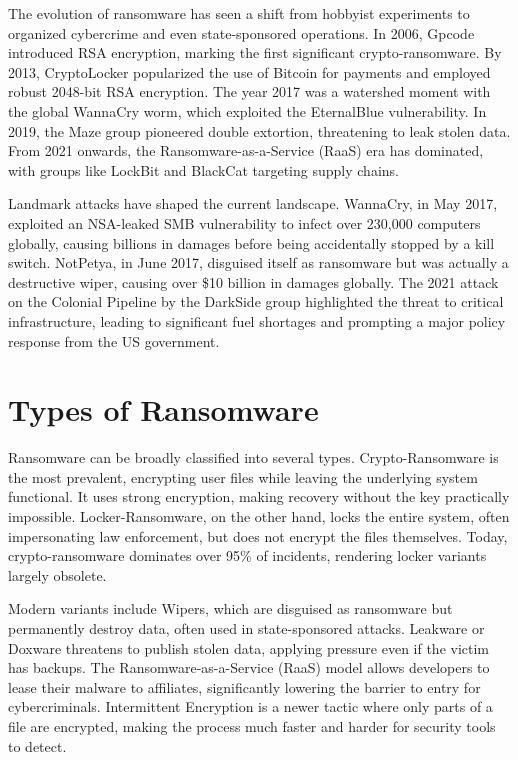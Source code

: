 \documentclass[12pt,a4paper]{article}
\begin{document}
The evolution of ransomware has seen a shift from hobbyist experiments to organized cybercrime and even state-sponsored operations. In 2006, Gpcode introduced RSA encryption, marking the first significant crypto-ransomware. By 2013, CryptoLocker popularized the use of Bitcoin for payments and employed robust 2048-bit RSA encryption. The year 2017 was a watershed moment with the global WannaCry worm, which exploited the EternalBlue vulnerability. In 2019, the Maze group pioneered double extortion, threatening to leak stolen data. From 2021 onwards, the Ransomware-as-a-Service (RaaS) era has dominated, with groups like LockBit and BlackCat targeting supply chains.

Landmark attacks have shaped the current landscape. WannaCry, in May 2017, exploited an NSA-leaked SMB vulnerability to infect over 230,000 computers globally, causing billions in damages before being accidentally stopped by a kill switch. NotPetya, in June 2017, disguised itself as ransomware but was actually a destructive wiper, causing over \$10 billion in damages globally. The 2021 attack on the Colonial Pipeline by the DarkSide group highlighted the threat to critical infrastructure, leading to significant fuel shortages and prompting a major policy response from the US government.

\section{Types of Ransomware}
Ransomware can be broadly classified into several types. Crypto-Ransomware is the most prevalent, encrypting user files while leaving the underlying system functional. It uses strong encryption, making recovery without the key practically impossible. Locker-Ransomware, on the other hand, locks the entire system, often impersonating law enforcement, but does not encrypt the files themselves. Today, crypto-ransomware dominates over 95\% of incidents, rendering locker variants largely obsolete.

Modern variants include Wipers, which are disguised as ransomware but permanently destroy data, often used in state-sponsored attacks. Leakware or Doxware threatens to publish stolen data, applying pressure even if the victim has backups. The Ransomware-as-a-Service (RaaS) model allows developers to lease their malware to affiliates, significantly lowering the barrier to entry for cybercriminals. Intermittent Encryption is a newer tactic where only parts of a file are encrypted, making the process much faster and harder for security tools to detect.
\end{document}
